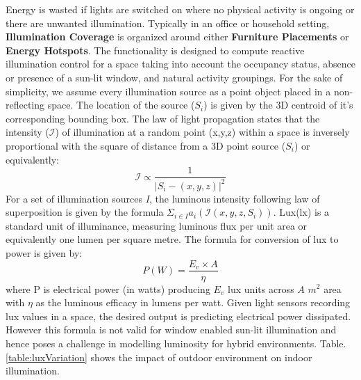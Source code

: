 Energy is wasted if lights are switched on where no physical activity is ongoing or there are unwanted illumination. Typically in an office or household setting, \textbf{Illumination Coverage} is organized around either \textbf{Furniture Placements} or \textbf{Energy Hotspots}. The functionality is designed to compute reactive illumination control for a space taking into account the occupancy status, absence or presence of a sun-lit window, and natural activity groupings. For the sake of simplicity, we assume every illumination source as a point object placed in a non-reflecting space. The location of the source ($S_i$) is given by the 3D centroid of it's corresponding bounding box. The law of light propagation \cite{voudoukis2017inverse} states that the intensity ($\mathcal{I}$) of illumination at a random point (x,y,z) within a space is inversely proportional with the square of distance from a 3D point source ($S_i$) or equivalently: 
\begin{equation}
    \mathcal{I} \propto \frac{1}{|S_i - (x,y,z)|^2}
\end{equation} For a set of illumination sources \textit{I}, the luminous intensity following law of superposition is given by the formula $\Sigma_{i \in I} a_i (\mathcal{I}(x,y,z, S_i ))$. Lux(lx) is a standard unit of illuminance, measuring luminous flux per unit area or equivalently one lumen per square metre. The formula for conversion of lux to power is given by: 
\begin{equation}
    P (W) = \frac{E_v \times A}{\eta}
    \label{eq:lux2Power}
\end{equation} where P is electrical power (in watts) producing $E_v$ lux units across $A$ $m^2$ area with $\eta$ as the luminous efficacy in lumens per watt. Given light sensors recording lux values in a space, the desired output is predicting electrical power dissipated. However this formula is not valid for window enabled sun-lit illumination and hence poses a challenge in modelling luminosity for hybrid environments. Table. \ref{table:luxVariation} shows the impact of outdoor environment on indoor illumination. %



